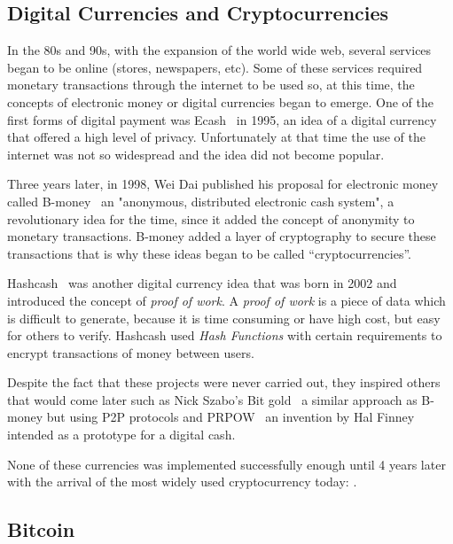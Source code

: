 \subsection{Digital Currencies and Cryptocurrencies}
\label{tb:cryptos}

In the 80s and 90s, with the expansion of the world wide web, several services
began to be online (stores, newspapers, etc). Some of these services required
monetary transactions through the internet to be used so, at this time, the
concepts of electronic money or digital currencies began to emerge. One of the
first forms of digital payment was Ecash~\cite{chaum1995introduction} in 1995,
an idea of a digital currency that offered a high level of privacy.
Unfortunately at that time the use of the internet was not so widespread and the
idea did not become popular.

Three years later, in 1998, Wei Dai published his proposal for electronic money
called B-money~\cite{dai1998b} an "anonymous, distributed electronic cash
system", a revolutionary idea for the time, since it added the concept of
anonymity to monetary transactions. B-money added a layer of cryptography to
secure these transactions that is why these ideas began to be called
``cryptocurrencies''.

Hashcash~\cite{back2002hashcash} was another digital currency idea that was born
in 2002 and introduced the concept of \emph{proof of work}. A \emph{proof of
  work} is a piece of data which is difficult to generate, because it is time
consuming or have high cost, but easy for others to verify. Hashcash used
\emph{Hash Functions} with certain requirements to encrypt transactions of money
between users.

Despite the fact that these projects were never carried out, they inspired
others that would come later such as Nick Szabo's Bit gold~\cite{szabo2008bit} a
similar approach as B-money but using P2P protocols and
PRPOW~\cite{finney2005rpow} an invention by Hal Finney intended as a prototype
for a digital cash.

None of these currencies was implemented successfully enough until 4 years later
with the arrival of the most widely used cryptocurrency today: .

\subsection{Bitcoin}
\label{tb:bc}


